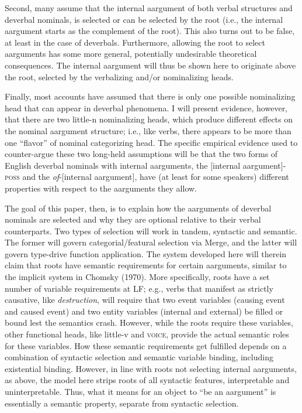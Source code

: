 \documentclass[12pt]{article}
\begin{document}
Second, many assume that the internal aargument of both verbal structures and deverbal nominals, is selected or can be selected by the root (i.e., the internal aargument starts as the complement of the root). This also turns out to be false, at least in the case of deverbals. Furthermore, allowing the root to select aarguments has some more general, potentially undesirable theoretical consequences. The internal aargument will thus be shown here to originate above the root, selected by the verbalizing and/or nominalizing heads. 

Finally, most accounts have assumed that there is only one possible nominalizing head that can appear in deverbal phenomena. I will present evidence, however, that there are two little-n nominalizing heads, which produce different effects on the nominal aargument structure; i.e., like verbs, there appears to be more than one ``flavor'' of nominal categorizing head. The specific empirical evidence used to counter-argue these two long-held assumptions will be that the two forms of English deverbal nominals with internal aarguments, the [internal aargument]-\textsc{poss} and the \textit{of}-[internal aargument], have (at least for some speakers) different properties with respect to the aarguments they allow.

The goal of this paper, then, is to explain how the aarguments of deverbal nominals are selected and why they are optional relative to their verbal counterparts. Two types of selection will work in tandem, syntactic and semantic. The former will govern categorial/featural selection via Merge, and the latter will govern type-drive function application. The system developed here will therein claim that roots have semantic requirements for certain aarguments, similar to the implicit system in Chomsky (1970). More specifically, roots have a set number of variable requirements at LF; e.g., verbs that manifest as strictly causative, like \textit{destruction}, will require that two event variables (causing event and caused event) and two entity variables (internal and external) be filled or bound lest the semantics crash. However, while the roots require these variables, other functional heads, like little-v and \textsc{voice}, provide the actual semantic roles for these variables. How these semantic requirements get fulfilled depends on a combination of syntactic selection and semantic variable binding, including existential binding. However, in line with roots not selecting internal aarguments, as above, the model here strips roots of all syntactic features, interpretable and uninterpretable. Thus, what it means for an object to ``be an aargument'' is essentially a semantic property, separate from syntactic selection.
\end{document}
